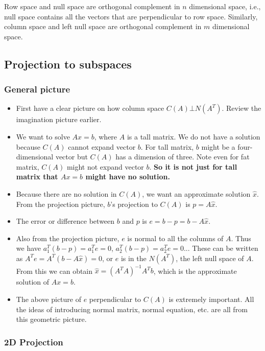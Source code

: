 \documentclass[11pt]{article}
\providecommand{\tightlist}{%
      \setlength{\itemsep}{0pt}\setlength{\parskip}{0pt}}
\begin{document}
Row space and null space are orthogonal complement in \(n\) dimensional
space, i.e., null space contains all the vectors that are perpendicular
to row space. Similarly, column space and left null space are orthogonal
complement in \(m\) dimensional space.

    \subsection{Projection to subspaces}\label{projection-to-subspaces}

\subsubsection{General picture}\label{general-picture}

\begin{itemize}
\tightlist
\item
  First have a clear picture on how column space \(C(A)\bot N(A^T)\).
  Review the imagination picture earlier.
\item
  We want to solve \(Ax = b\), where \(A\) is a tall matrix. We do not
  have a solution because \(C(A)\) cannot expand vector \(b\). For tall
  matrix, \(b\) might be a four-dimensional vector but \(C(A)\) has a
  dimension of three. Note even for fat matrix, \(C(A)\) might not
  expand vector \(b\). \textbf{So it is not just for tall matrix that
  \(Ax = b\) might have no solution.}
\item
  Because there are no solution in \(C(A)\), we want an approximate
  solution \(\hat{x}\). From the projection picture, \(b\)'s projection
  to \(C(A)\) is \(p = A\hat{x}\).
\item
  The error or difference between \(b\) and \(p\) is
  \(e = b-p = b - A\hat{x}\).
\item
  Also from the projection picture, \(e\) is normal to all the columns
  of \(A\). Thus we have \(a_1^T(b-p) = a_1^Te = 0\),
  \(a_2^T(b-p) = a_2^Te = 0\)... These can be written as
  \(A^T e = A^T(b-A\hat{x}) = 0\), or \(e\) is in the \(N(A^T)\), the
  left null space of \(A\). From this we can obtain
  \(\hat{x} = (A^TA)^{-1}A^Tb\), which is the approximate solution of
  \(Ax = b\).
\item
  The above picture of \(e\) perpendicular to \(C(A)\) is extremely
  important. All the ideas of introducing normal matrix, normal
  equation, etc. are all from this geometric picture.
\end{itemize}

\subsubsection{2D Projection}\label{d-projection}
\end{document}
